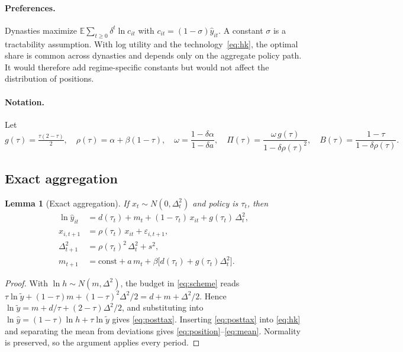 \documentclass[11pt]{article}
\newtheorem{lemma}{Lemma}
\theoremstyle{remark}
\newcommand{\E}{\mathbb{E}}
\begin{document}
\paragraph{Preferences.}  Dynasties maximize $\E\sum_{t\ge0}\delta^t\ln c_{it}$ with $c_{it}=(1-\sigma)\hat y_{it}$.  A constant $\sigma$ is a tractability assumption.  With log utility and the technology~\eqref{eq:hk}, the optimal share is common across dynasties and depends only on the aggregate policy path.  It would therefore add regime-specific constants but would not affect the distribution of positions.

\paragraph{Notation.}  Let
\[
g(\tau)=\tfrac{\tau(2-\tau)}{2},\quad
\rho(\tau)=\alpha+\beta(1-\tau),\quad
\omega=\frac{1-\delta\alpha}{1-\delta a},\quad
\Pi(\tau)=\frac{\omega\,g(\tau)}{1-\delta\rho(\tau)^2},\quad
B(\tau)=\frac{1-\tau}{1-\delta\rho(\tau)} .
\]

\subsection{Exact aggregation}

\begin{lemma}[Exact aggregation]\label{lem:agg}
If $x_{t}\sim N(0,\Delta_t^2)$ and policy is $\tau_t$, then
\begin{align}
\ln\hat y_{it}&=d(\tau_t)+m_t+(1-\tau_t)\,x_{it}+g(\tau_t)\,\Delta_t^2, \label{eq:posttax}\\
x_{i,t+1}&=\rho(\tau_t)\,x_{it}+\varepsilon_{i,t+1}, \label{eq:position}\\
\Delta_{t+1}^2&=\rho(\tau_t)^2\,\Delta_t^2+s^2, \label{eq:variance}\\
m_{t+1}&=\text{const}+a\,m_t+\beta\big[d(\tau_t)+g(\tau_t)\Delta_t^2\big]. \label{eq:mean}
\end{align}
\end{lemma}

\begin{proof}
With $\ln h\sim N(m,\Delta^2)$, the budget in \eqref{eq:scheme} reads $\tau\ln\tilde y+(1-\tau)m+(1-\tau)^2\Delta^2/2=d+m+\Delta^2/2$.  Hence $\ln\tilde y=m+d/\tau+(2-\tau)\Delta^2/2$, and substituting into $\ln\hat y=(1-\tau)\ln h+\tau\ln\tilde y$ gives \eqref{eq:posttax}.  Inserting \eqref{eq:posttax} into \eqref{eq:hk} and separating the mean from deviations gives \eqref{eq:position}--\eqref{eq:mean}.  Normality is preserved, so the argument applies every period.
\end{proof}
\end{document}
